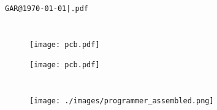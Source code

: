 \documentclass[a4paper,12pt]{scrartcl}
\begin{document}

\renewcommand{\tablename}{Tab.}


\iftitlepage
  
  \maketitle

  \thispagestyle{empty}
  \newpage

  \ifblankpageaftertitlepage
    ~
    \thispagestyle{empty}
    \newpage
  \fi
\fi

\ifsoftwarepage
  

  \thispagestyle{empty}
  \newpage
\fi

\section*{\abstracttitle}
\abstracttext

\thispagestyle{empty}
\newpage

\setcounter{page}{1}

\noindent\hfill\texttt{GAR@\today|\jobname.pdf}
\vspace{-25pt}

\section{\pcbsectiontitle}

\begin{figure}[!htbp]
  \vspace{-20pt}
  \centering
  \texttt{[image: pcb.pdf]}
  \caption{\pcbfigureassemblytopcaptiontext}
  \label{fig:pcb-top-assembly}
\end{figure}
\newpage

\begin{figure}[!htbp]
  \centering
  \texttt{[image: pcb.pdf]}
  \caption{\pcbfigureassemblybottomcaptiontext}
  \label{fig:pcb-bottom-assembly}
\end{figure}
\newpage

\section{\programmersectiontitle}

\begin{figure}
  \vspace{-50pt}
  \texttt{[image: ./images/programmer\_assembled.png]}
  \caption{\programmerfigureprogrammercaptiontext}
  \label{fig:rcc-programmer-image}
\end{figure}
\end{document}
